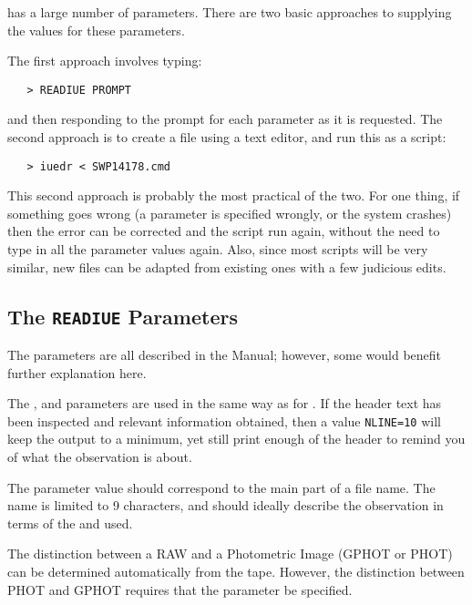  has a large number of parameters.
There are two basic approaches to supplying the values for these parameters.

The first approach involves typing:

\begin{verbatim}
   > READIUE PROMPT
\end{verbatim}

and then responding to the prompt for each parameter as it is requested.
The second approach is to create a file using a text editor, and run this as a
script:

\begin{verbatim}
   > iuedr < SWP14178.cmd
\end{verbatim}

This second approach is probably the most practical of the two.  For one
thing, if something goes wrong (a parameter is specified wrongly, or the
system crashes) then the error can be corrected and the script run again,
without the need to type in all the parameter values again.  Also, since most
scripts will be very similar, new files can be adapted from existing ones
with a few judicious edits.


\subsection{The {\tt READIUE} Parameters}

The  parameters are all described in the
Manual; however, some would benefit further explanation here.

The , 
and  parameters are used in the same
way as for \@.  If the header text 
has been inspected and relevant information obtained, then a value 
\verb+NLINE=10+ will keep the output to a minimum, yet still print enough 
of the header to remind you of what the observation is about.

The  parameter value should correspond to 
the main part of a file name.  The name is limited to 9 characters, and 
should ideally describe the observation in terms of the 
 and 
 used.

The distinction between a RAW and a Photometric Image (GPHOT or PHOT) can
be determined automatically from the tape. However, the distinction between
PHOT and GPHOT requires that the 
 parameter be specified.

